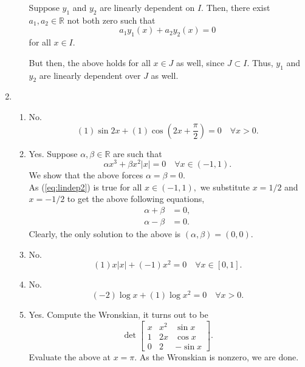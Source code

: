 \documentclass[12pt]{article}
\theoremstyle{definition}
\numberwithin{thm}{section}
\begin{document}
\begin{enumerate}[leftmargin=*, label = Q.\arabic*.]
\begin{enumerate}[label = (\roman*)]
		Suppose $y_1$ and $y_2$ are linearly dependent on $I.$ Then, there exist $a_1, a_2 \in \mathbb{R}$ not both zero such that
		\begin{equation*} 
			a_1y_1(x) + a_2y_2(x) = 0
		\end{equation*}
		for all $x \in I.$

		But then, the above holds for all $x \in J$ as well, since $J \subset I.$ Thus, $y_1$ and $y_2$ are linearly dependent over $J$ as well.
	\end{enumerate}
	\item 
	\begin{enumerate}[label = (\roman*)] 
		\item No.
		\begin{equation*} 
			(1)\sin2x + (1)\cos\left(2x + \frac{\pi}{2}\right) = 0 \quad \forall x > 0.
		\end{equation*}
		\item Yes. Suppose $\alpha, \beta \in \mathbb{R}$ are such that
		\begin{equation} \label{eq:lindep2} 
			\alpha x^3 + \beta x^2|x| = 0 \quad \forall x \in (-1, 1).
		\end{equation}
		We show that the above forces $\alpha = \beta = 0.$\\
		As (\ref{eq:lindep2}) is true for all $x \in (-1, 1),$ we substitute $x = 1/2$ and $x = -1/2$ to get the above following equations,
		\begin{align*} 
			\alpha + \beta &= 0,\\
			\alpha - \beta &= 0.
		\end{align*}
		Clearly, the only solution to the above is $(\alpha, \beta) = (0, 0).$
		\item No.
		\begin{equation*} 
			(1)x|x| + (-1)x^2 = 0 \quad \forall x \in [0, 1].
		\end{equation*}
		\item No.
		\begin{equation*} 
			(-2)\log x + (1)\log x^2 = 0 \quad \forall x > 0.
		\end{equation*}
		\item Yes. Compute the Wronskian, it turns out to be
		\[\det\begin{bmatrix}
			x & x^2 & \sin x\\
			1 & 2x & \cos x\\
			0 & 2 & -\sin x
		\end{bmatrix}.\]
		Evaluate the above at $x = \pi.$ As the Wronskian is nonzero, we are done.

\end{enumerate}
\end{enumerate}
\end{document}

